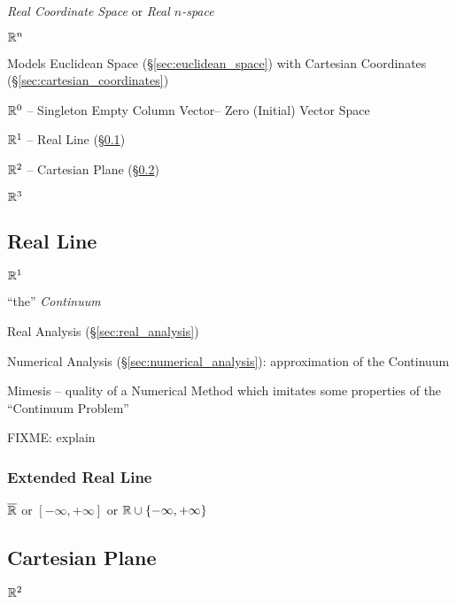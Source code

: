 \emph{Real Coordinate Space} or \emph{Real $n$-space}

$\mathbb{R}^n$

Models Euclidean Space (\S\ref{sec:euclidean_space}) with Cartesian
Coordinates (\S\ref{sec:cartesian_coordinates})

$\mathbb{R}^0$ -- Singleton Empty Column Vector-- Zero (Initial) Vector
Space

$\mathbb{R}^1$ -- Real Line (\S\ref{sec:real_line})

$\mathbb{R}^2$ -- Cartesian Plane (\S\ref{sec:cartesian_plane})

$\mathbb{R}^3$



\subsection{Real Line}\label{sec:real_line}

$\mathbb{R}^1$

``the'' \emph{Continuum}

\fist Real Analysis (\S\ref{sec:real_analysis})

\fist Numerical Analysis (\S\ref{sec:numerical_analysis}): approximation of the
Continuum

Mimesis -- quality of a Numerical Method which imitates some properties of the
``Continuum Problem''

FIXME: explain



\subsubsection{Extended Real Line}\label{sec:extended_real_line}

$\overline{\mathbb{R}}$ or $[-\infty, +\infty]$ or $\mathbb{R} \cup \{
-\infty, +\infty\}$




\subsection{Cartesian Plane}\label{sec:cartesian_plane}

$\mathbb{R}^2$

